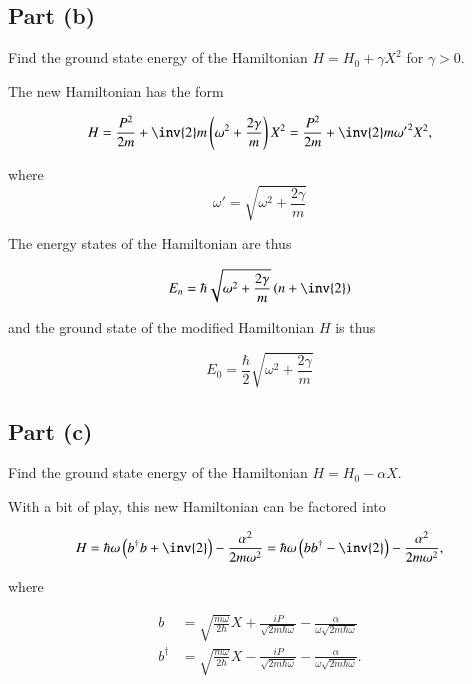 \subsection{Part (b)}

Find the ground state energy of the Hamiltonian $H = H_0 + \gamma X^2$ for $\gamma > 0$.

The new Hamiltonian has the form

\begin{equation}\label{eqn:phy456ps1:520}
H = \frac{P^2}{2m} + \inv{2} m \left(\omega^2 + \frac{2 \gamma}{m} \right) X^2 =
\frac{P^2}{2m} + \inv{2} m {\omega'}^2 X^2,
\end{equation}

where
\begin{equation}\label{eqn:phy456ps1:540}
\omega' = \sqrt{ \omega^2 + \frac{2 \gamma}{m} }
\end{equation}

The energy states of the Hamiltonian are thus

\begin{equation}\label{eqn:phy456ps1:560}
E_n = \hbar \sqrt{ \omega^2 + \frac{2 \gamma}{m} } \left( n + \inv{2} \right)
\end{equation}

and the ground state of the modified Hamiltonian $H$ is thus

\begin{equation}\label{eqn:phy456ps1:580}
E_0 = \frac{\hbar}{2} \sqrt{ \omega^2 + \frac{2 \gamma}{m} }
\end{equation}

\subsection{Part (c)}

Find the ground state energy of the Hamiltonian $H = H_0 - \alpha X$.

With a bit of play, this new Hamiltonian can be factored into

\begin{equation}\label{eqn:phy456ps1:590}
H
= \hbar \omega \left( b^\dagger b + \inv{2} \right) - \frac{\alpha^2}{2 m \omega^2}
= \hbar \omega \left( b b^\dagger - \inv{2} \right) - \frac{\alpha^2}{2 m \omega^2},
\end{equation}

where

\begin{align}\label{eqn:phy456ps1:600}
b &= \sqrt{\frac{m \omega}{2\hbar}} X + \frac{i P}{\sqrt{2 m \hbar \omega}} - \frac{\alpha}{\omega \sqrt{ 2 m \hbar \omega }} \\
b^\dagger &= \sqrt{\frac{m \omega}{2\hbar}} X - \frac{i P}{\sqrt{2 m \hbar \omega}} - \frac{\alpha}{\omega \sqrt{ 2 m \hbar \omega }}.
\end{align}


